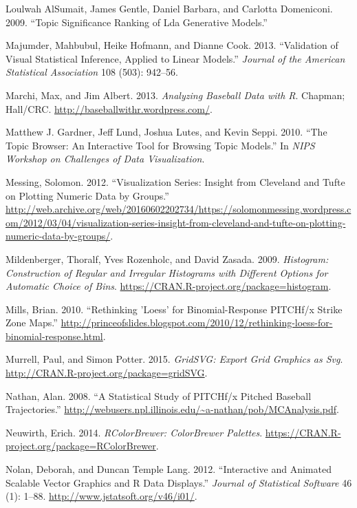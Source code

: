 \documentclass[12pt,]{isuthesis}
\begin{document}
\hypertarget{ref-AlSumait}{}
Loulwah AlSumait, James Gentle, Daniel Barbara, and Carlotta Domeniconi.
2009. ``Topic Significance Ranking of Lda Generative Models.''

\hypertarget{ref-Majumder:2013ie}{}
Majumder, Mahbubul, Heike Hofmann, and Dianne Cook. 2013. ``Validation
of Visual Statistical Inference, Applied to Linear Models.''
\emph{Journal of the American Statistical Association} 108 (503):
942--56.

\hypertarget{ref-baseball}{}
Marchi, Max, and Jim Albert. 2013. \emph{Analyzing Baseball Data with
R}. Chapman; Hall/CRC. \url{http://baseballwithr.wordpress.com/}.

\hypertarget{ref-Gardner}{}
Matthew J. Gardner, Jeff Lund, Joshua Lutes, and Kevin Seppi. 2010.
``The Topic Browser: An Interactive Tool for Browsing Topic Models.'' In
\emph{NIPS Workshop on Challenges of Data Visualization}.

\hypertarget{ref-messing}{}
Messing, Solomon. 2012. ``Visualization Series: Insight from Cleveland
and Tufte on Plotting Numeric Data by Groups.''
\url{http://web.archive.org/web/20160602202734/https://solomonmessing.wordpress.com/2012/03/04/visualization-series-insight-from-cleveland-and-tufte-on-plotting-numeric-data-by-groups/}.

\hypertarget{ref-histogram}{}
Mildenberger, Thoralf, Yves Rozenholc, and David Zasada. 2009.
\emph{Histogram: Construction of Regular and Irregular Histograms with
Different Options for Automatic Choice of Bins}.
\url{https://CRAN.R-project.org/package=histogram}.

\hypertarget{ref-loess}{}
Mills, Brian. 2010. ``Rethinking 'Loess' for Binomial-Response PITCHf/x
Strike Zone Maps.''
\url{http://princeofslides.blogspot.com/2010/12/rethinking-loess-for-binomial-response.html}.

\hypertarget{ref-gridSVG}{}
Murrell, Paul, and Simon Potter. 2015. \emph{GridSVG: Export Grid
Graphics as Svg}. \url{http://CRAN.R-project.org/package=gridSVG}.

\hypertarget{ref-trajecoryAnalysis}{}
Nathan, Alan. 2008. ``A Statistical Study of PITCHf/x Pitched Baseball
Trajectories.''
\url{http://webusers.npl.illinois.edu/~a-nathan/pob/MCAnalysis.pdf}.

\hypertarget{ref-RColorBrewer}{}
Neuwirth, Erich. 2014. \emph{RColorBrewer: ColorBrewer Palettes}.
\url{https://CRAN.R-project.org/package=RColorBrewer}.

\hypertarget{ref-SVGAnnotation}{}
Nolan, Deborah, and Duncan Temple Lang. 2012. ``Interactive and Animated
Scalable Vector Graphics and R Data Displays.'' \emph{Journal of
Statistical Software} 46 (1): 1--88.
\url{http://www.jstatsoft.org/v46/i01/}.
\end{document}
